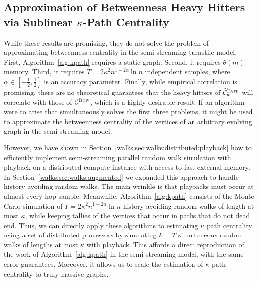 \documentclass[10]{report}
\newcommand{\algoname}[1]{\textnormal{\textsc{#1}}}
\begin{document}
\subsection{Approximation of Betweenness Heavy Hitters via Sublinear $\kappa$-Path Centrality} 
\label{sec:kpc:hh}


While these results are promising, they do not solve the problem of approximating betweenness centrality in the semi-streaming turnstile model. 
First, Algorithm~\ref{alg:kpath} requires a static graph.
Second, it requires $\theta(m)$ memory. 
Third, it requires $T = 2 \kappa^2 n^{1-2\alpha} \ln n$ independent samples, where $\alpha \in \left [ -\frac{1}{2}, \frac{1}{2} \right ]$ is an accuracy parameter. 
Finally, while empirical correlation is promising, there are no theoretical guarantees that the heavy hitters of $\widetilde{\mathcal{C}}_\kappa^{\algoname{Path}}$ will correlate with those of $\mathcal{C}^{\algoname{Btw}}$, which is a highly desirable result. 
If an algorithm were to arise that simultaneously solves the first three problems, it might be used to approximate the betweenness centrality of the vertices of an arbitrary evolving graph in the semi-streaming model. 

However, we have shown in Section~\ref{walks:sec:walks:distributed:playback} how to efficiently implement semi-streaming parallel random walk simulation with playback on a distributed compute instance with access to fast external memory.
In Section~\ref{walks:sec:walks:augmented} we expanded this approach to handle history avoiding random walks. 
The main wrinkle is that playbacks must occur at almost every hop sample.
Meanwhile, Algorithm~\ref{alg:kpath} consists of the Monte Carlo simulation of $T = 2 \kappa^2 n^{1-2\alpha} \ln n$ history avoiding random walks of length at most $\kappa$, while keeping tallies of the vertices that occur in paths that do not dead end.
Thus, we can directly apply these algorithms to estimating $\kappa$ path centrality using a set of distributed processors by simulating $k = T$ simultaneous random walks of lengths at most $\kappa$ with playback. 
This affords a direct reproduction of the work of Algorithm~\ref{alg:kpath} in the semi-streaming model, with the same error guarantees.
Moreover, it allows us to scale the estimation of $\kappa$ path centrality to truly massive graphs.
\end{document}
